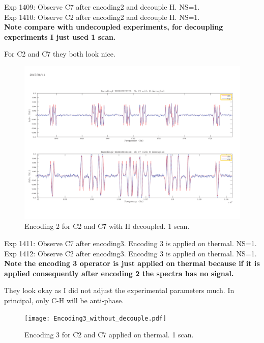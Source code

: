 \clearpage
Exp 1409: Observe C7 after encoding2 and decouple H. NS=1.\\
Exp 1410: Observe C2 after encoding2 and decouple H. NS=1.\\
\textbf{Note compare with undecoupled experiments, for decoupling experiments I just used 1 scan.}

For C2 and C7 they both look nice.

\begin{figure}[htb]
\begin{center}
\includegraphics[width=\columnwidth]{Encoding2_with_decouple.pdf}
\end{center}
\setlength{\abovecaptionskip}{-0.35cm}
\caption{\footnotesize{Encoding 2 for C2 and C7 with H decoupled. 1 scan.}}\label{1409and1410}
\end{figure}

\clearpage
Exp 1411: Observe C7 after encoding3. Encoding 3 is applied on thermal. NS=1.\\
Exp 1412: Observe C2 after encoding3. Encoding 3 is applied on thermal. NS=1.\\
\textbf{Note the encoding 3 operator is just applied on thermal because if it is applied consequently after encoding 2 the spectra has no signal.}

They look okay as I did not adjust the experimental parameters much. In principal, only C-H will be anti-phase.

\begin{figure}[htb]
\begin{center}
\texttt{[image: Encoding3\_without\_decouple.pdf]}
\end{center}
\setlength{\abovecaptionskip}{-0.35cm}
\caption{\footnotesize{Encoding 3 for C2 and C7 applied on thermal. 1 scan.}}\label{1411and1412}
\end{figure} 

